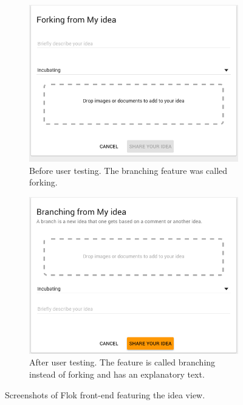 \documentclass[a4paper,12pt, oneside]{article}
\begin{document}
\begin{figure}[!htb]
    \begin{subfigure}[t]{.495\textwidth}
        \includegraphics[width=\textwidth]{images/user_tests/forkBranchForm_before.png}
        \caption{Before user testing. The branching feature was called forking.}
        \label{fig.tests.forkBranchForm.before}
    \end{subfigure}
    \hfill
    \begin{subfigure}[t]{.495\textwidth}
        \includegraphics[width=\textwidth]{images/user_tests/forkBranchForm_after.png}
        \caption{After user testing. The feature is called branching instead of forking and has an explanatory text.}
        \label{fig.tests.forkBranchForm.after}
    \end{subfigure}
    \caption{Screenshots of Flok front-end featuring the idea view.}
    \label{fig.tests.forkBranchForm}
\end{figure}
\end{document}
